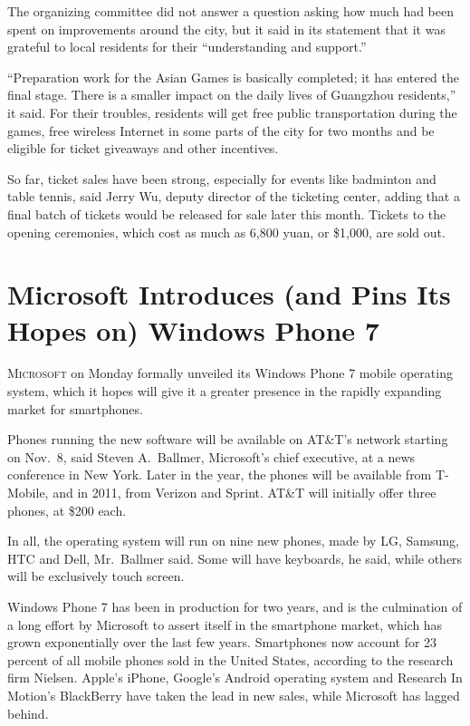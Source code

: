 ﻿\documentclass[12pt]{article}
\begin{document}
The organizing committee did not answer a question asking how much had been spent on improvements
around the city, but it said in its statement that it was grateful to local residents for their
``understanding and support.''

``Preparation work for the Asian Games is basically completed; it has entered the final stage. There
is a smaller impact on the daily lives of Guangzhou residents,'' it said. For their troubles,
residents will get free public transportation during the games, free wireless Internet in some parts
of the city for two months and be eligible for ticket giveaways and other incentives.

So far, ticket sales have been strong, especially for events like badminton and table tennis, said
Jerry Wu, deputy director of the ticketing center, adding that a final batch of tickets would be
released for sale later this month. Tickets to the opening ceremonies, which cost as much as 6,800
yuan, or \$1,000, are sold out.

\section{Microsoft Introduces (and Pins Its Hopes on) Windows Phone 7}

\lettrine{M}{icrosoft} on Monday formally unveiled its Windows Phone 7
mobile operating system, which it hopes will give it a greater presence in the rapidly expanding
market for smartphones.

Phones running the new software will be available on AT\&T's network starting on Nov.~8, said Steven
A.~Ballmer, Microsoft's chief executive, at a news conference in New York. Later in the year, the
phones will be available from T-Mobile, and in 2011, from Verizon and Sprint. AT\&T will initially
offer three phones, at \$200 each.

In all, the operating system will run on nine new phones, made by LG, Samsung, HTC and Dell,
Mr.~Ballmer said. Some will have keyboards, he said, while others will be exclusively touch screen.

Windows Phone 7 has been in production for two years, and is the culmination of a long effort by
Microsoft to assert itself in the smartphone market, which has grown exponentially over the last few
years. Smartphones now account for 23 percent of all mobile phones sold in the United States,
according to the research firm Nielsen. Apple's iPhone, Google's Android operating system and
Research In Motion's BlackBerry have taken the lead in new sales, while Microsoft has lagged behind.
\end{document}
